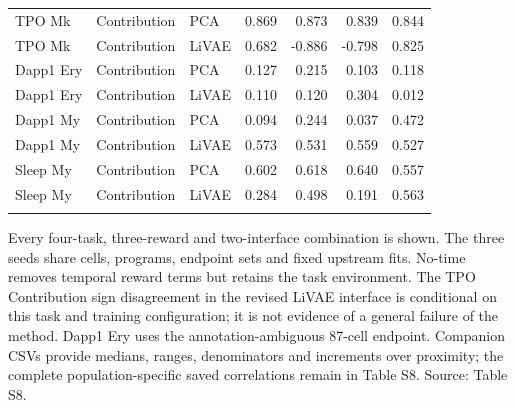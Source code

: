 \begin{longtable}{@{\extracolsep{\fill}}lllrrrr@{}}
\addlinespace[.25em]
TPO Mk & Contribution & PCA & 0.869 & 0.873 & 0.839 & 0.844 \\
TPO Mk & Contribution & LiVAE & 0.682 & -0.886 & -0.798 & 0.825 \\
\addlinespace[.25em]
Dapp1 Ery & Contribution & PCA & 0.127 & 0.215 & 0.103 & 0.118 \\
Dapp1 Ery & Contribution & LiVAE & 0.110 & 0.120 & 0.304 & 0.012 \\
\addlinespace[.25em]
Dapp1 My & Contribution & PCA & 0.094 & 0.244 & 0.037 & 0.472 \\
Dapp1 My & Contribution & LiVAE & 0.573 & 0.531 & 0.559 & 0.527 \\
\addlinespace[.25em]
Sleep My & Contribution & PCA & 0.602 & 0.618 & 0.640 & 0.557 \\
Sleep My & Contribution & LiVAE & 0.284 & 0.498 & 0.191 & 0.563 \\
\addlinespace[.25em]
\bottomrule
\end{longtable}
\par\smallskip\small
Every four-task, three-reward and two-interface combination is shown. The three seeds share cells, programs, endpoint sets and fixed upstream fits. No-time removes temporal reward terms but retains the task environment. The TPO Contribution sign disagreement in the revised LiVAE interface is conditional on this task and training configuration; it is not evidence of a general failure of the method. Dapp1 Ery uses the annotation-ambiguous 87-cell endpoint. Companion CSVs provide medians, ranges, denominators and increments over proximity; the complete population-specific saved correlations remain in Table S8. Source: Table S8.
\endgroup

